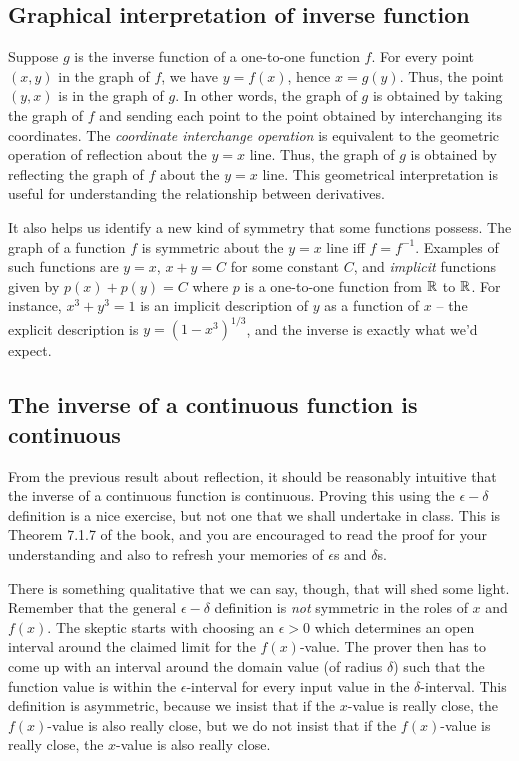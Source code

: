 \documentclass[10pt]{amsart}
\begin{document}
\subsection{Graphical interpretation of inverse function}

Suppose $g$ is the inverse function of a one-to-one function $f$. For
every point $(x,y)$ in the graph of $f$, we have $y = f(x)$, hence $x
= g(y)$. Thus, the point $(y,x)$ is in the graph of $g$. In other
words, the graph of $g$ is obtained by taking the graph of $f$ and
sending each point to the point obtained by interchanging its
coordinates. The {\em coordinate interchange operation} is equivalent
to the geometric operation of reflection about the $y = x$ line. Thus,
the graph of $g$ is obtained by reflecting the graph of $f$ about the
$y = x$ line. This geometrical interpretation is useful for
understanding the relationship between derivatives.

It also helps us identify a new kind of symmetry that some functions
possess. The graph of a function $f$ is symmetric about the $y = x$
line iff $f = f^{-1}$. Examples of such functions are $y = x$, $x + y
= C$ for some constant $C$, and {\em implicit} functions given by
$p(x) + p(y) = C$ where $p$ is a one-to-one function from $\mathbb{R}$ to
$\mathbb{R}$. For instance, $x^3 + y^3 = 1$ is an implicit description of $y$
as a function of $x$ -- the explicit description is $y = (1 -
x^3)^{1/3}$, and the inverse is exactly what we'd expect.

\subsection{The inverse of a continuous function is continuous}

From the previous result about reflection, it should be reasonably
intuitive that the inverse of a continuous function is
continuous. Proving this using the $\epsilon-\delta$ definition is a
nice exercise, but not one that we shall undertake in class. This is
Theorem 7.1.7 of the book, and you are encouraged to read the proof
for your understanding and also to refresh your memories of
$\epsilon$s and $\delta$s.

There is something qualitative that we can say, though, that will shed
some light. Remember that the general $\epsilon-\delta$ definition is
{\em not} symmetric in the roles of $x$ and $f(x)$. The skeptic starts
with choosing an $\epsilon > 0$ which determines an open interval
around the claimed limit for the $f(x)$-value. The prover then has to
come up with an interval around the domain value (of radius $\delta$)
such that the function value is within the $\epsilon$-interval for
every input value in the $\delta$-interval. This definition is
asymmetric, because we insist that if the $x$-value is really close,
the $f(x)$-value is also really close, but we do not insist that if
the $f(x)$-value is really close, the $x$-value is also really close.
\end{document}
